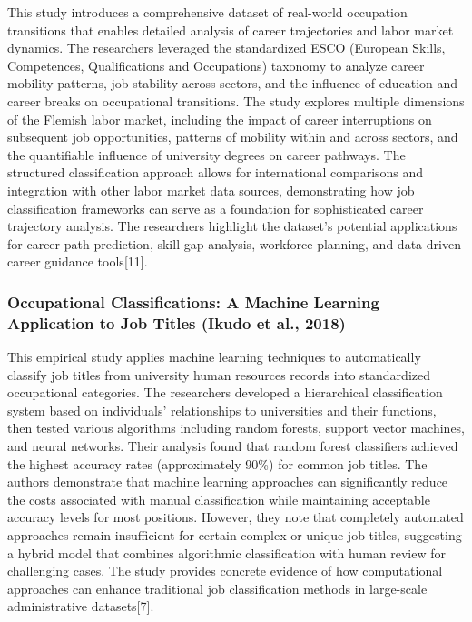 \documentclass[
  letterpaper,
  DIV=11,
  numbers=noendperiod]{scrartcl}
\begin{document}
This study introduces a comprehensive dataset of real-world occupation
transitions that enables detailed analysis of career trajectories and
labor market dynamics. The researchers leveraged the standardized ESCO
(European Skills, Competences, Qualifications and Occupations) taxonomy
to analyze career mobility patterns, job stability across sectors, and
the influence of education and career breaks on occupational
transitions. The study explores multiple dimensions of the Flemish labor
market, including the impact of career interruptions on subsequent job
opportunities, patterns of mobility within and across sectors, and the
quantifiable influence of university degrees on career pathways. The
structured classification approach allows for international comparisons
and integration with other labor market data sources, demonstrating how
job classification frameworks can serve as a foundation for
sophisticated career trajectory analysis. The researchers highlight the
dataset's potential applications for career path prediction, skill gap
analysis, workforce planning, and data-driven career guidance
tools{[}11{]}.

\subsubsection{Occupational Classifications: A Machine Learning
Application to Job Titles (Ikudo et al.,
2018)}\label{occupational-classifications-a-machine-learning-application-to-job-titles-ikudo-et-al.-2018}

This empirical study applies machine learning techniques to
automatically classify job titles from university human resources
records into standardized occupational categories. The researchers
developed a hierarchical classification system based on individuals'
relationships to universities and their functions, then tested various
algorithms including random forests, support vector machines, and neural
networks. Their analysis found that random forest classifiers achieved
the highest accuracy rates (approximately 90\%) for common job titles.
The authors demonstrate that machine learning approaches can
significantly reduce the costs associated with manual classification
while maintaining acceptable accuracy levels for most positions.
However, they note that completely automated approaches remain
insufficient for certain complex or unique job titles, suggesting a
hybrid model that combines algorithmic classification with human review
for challenging cases. The study provides concrete evidence of how
computational approaches can enhance traditional job classification
methods in large-scale administrative datasets{[}7{]}.
\end{document}
